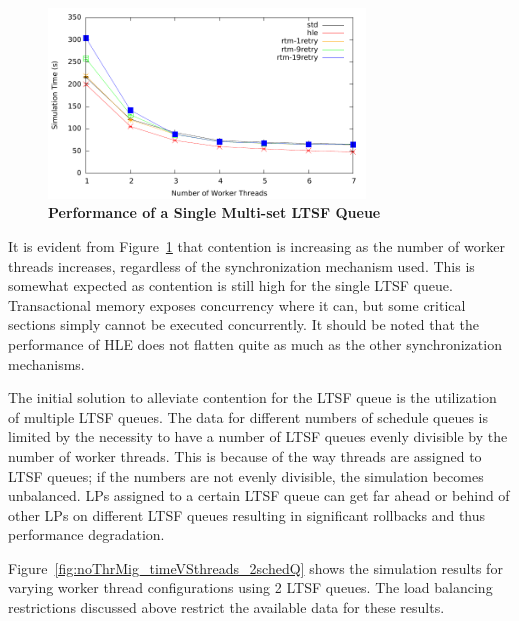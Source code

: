 \documentclass[11pt]{book}
\begin{document}
\begin{figure}
    \centering
    \graphicspath{ {./figures/} }
    \includegraphics[width=0.75\textwidth,keepaspectratio]{hugeepidemicsim-NOmig-timeVSthreads-multiset-1schQ}
    \caption{\textbf{Performance of a Single Multi-set LTSF Queue}}
    \label{fig:noThrMig_timeVSthreads_1schq}
\end{figure}

It is evident from Figure~\ref{fig:noThrMig_timeVSthreads_1schq} that contention is
increasing as the number of worker threads increases, regardless of the synchronization
mechanism used.  This is somewhat expected as contention is still high for the single LTSF
queue.  Transactional memory exposes concurrency where it can, but some critical sections
simply cannot be executed concurrently.  It should be noted that the performance of HLE
does not flatten quite as much as the other synchronization mechanisms.

The initial solution to alleviate contention for the LTSF queue is the
utilization of multiple LTSF queues.  The data for different numbers of
schedule queues is limited by the necessity to have a number of LTSF queues
evenly divisible by the number of worker threads.  This is because of the way
threads are assigned to LTSF queues; if the numbers are not evenly divisible,
the simulation becomes unbalanced.  LPs assigned to a certain LTSF queue can
get far ahead or behind of other LPs on different LTSF queues resulting in
significant rollbacks and thus performance degradation.  

Figure~\ref{fig:noThrMig_timeVSthreads_2schedQ} shows the simulation results for varying
worker thread configurations using 2 LTSF queues.  The load balancing restrictions discussed
above restrict the available data for these results.
\end{document}
